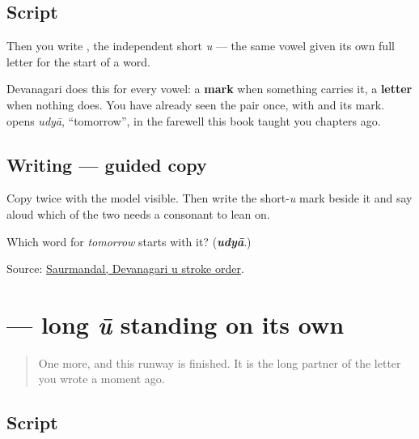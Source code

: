 \subsection*{Script}
\begin{quote}
\end{quote}

Then you write \textbf{}, the independent short \emph{u} — the same vowel given its own full letter for the start of a word.

Devanagari does this for every vowel: a \textbf{mark} when something carries it, a \textbf{letter} when nothing does. You have already seen the pair once, with \textbf{} and its mark. \textbf{} opens \emph{udyā}, \textquotedblleft{}tomorrow\textquotedblright{}, in the farewell this book taught you chapters ago.

\subsection*{Writing — guided copy}

Copy \textbf{} twice with the model visible. Then write the short-\emph{u} mark beside it and say aloud which of the two needs a consonant to lean on.

\begin{tcolorbox}[breakable,colback=teal!4,colframe=teal!35!black,title={Before you move on}]
Which word for \emph{tomorrow} starts with it? (\emph{\textbf{udyā}}.)

Source: \href{https://commons.wikimedia.org/wiki/File:Devanagari\_\%E0\%A4\%89\_stroke\_order.svg}{Saurmandal, Devanagari u stroke order}.
\end{tcolorbox}
\section[\texorpdfstring{\mr{ऊ} (ū)}{ऊ (ū)}]{ — long \emph{ū} standing on its own}

\label{lesson:MR-W08-uu-independent}



\begin{quote}
One more, and this runway is finished. It is the long partner of the letter you wrote a moment ago.
\end{quote}

\subsection*{Script}
\begin{quote}
\end{quote}

